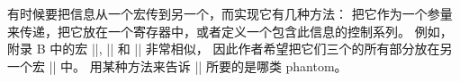 {{{{{{{{%
\ddanger \1有时候要把信息从一个宏传到另一个，而实现它有几种方法：
把它作为一个参量来传递，把它放在一个寄存器中，或者定义一个包含此信息的控制系列。%
例如，附录 B 中的宏 |\hphantom|, |\vphantom| 和 |\phantom| 非常相似，
因此作者希望把它们三个的所有部分放在另一个宏 |\phant| 中。%
用某种方法来告诉 |\phant| 所要的是哪类 phantom。%
}}}}}}}}

